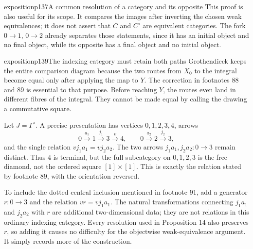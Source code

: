 \begin{dcomment}{exposition}{p137}{A common resolution of a category and its opposite}
This proof is also useful for its scope. It compares the images after inverting the chosen weak equivalences; it does not assert that $C$ and $C^\circ$ are equivalent categories. The fork $0\to1$, $0\to2$ already separates those statements, since it has an initial object and no final object, while its opposite has a final object and no initial object.
\end{dcomment}

\begin{dcomment}{exposition}{p139}{The indexing category must retain both paths}
Grothendieck keeps the entire comparison diagram because the two routes from $X_0$ to the integral become equal only after applying the map to $Y$. The correction in footnotes 88 and 89 is essential to that purpose. Before reaching $Y$, the routes even land in different fibres of the integral. They cannot be made equal by calling the drawing a commutative square.

Let $J=\Gamma^\circ$. A precise presentation has vertices $0,1,2,3,4$, arrows
\[
 0\xrightarrow{a_1}1\xrightarrow{j_1}3\xrightarrow{v}4,
 \qquad
 0\xrightarrow{a_2}2\xrightarrow{j_2}3,
\]
and the single relation $v j_1a_1=v j_2a_2$. The two arrows $j_1a_1,j_2a_2:0\to3$ remain distinct. Thus $4$ is terminal, but the full subcategory on $0,1,2,3$ is the free diamond, not the ordered square $[1]\times[1]$. This is exactly the relation stated by footnote 89, with the orientation reversed.

To include the dotted central inclusion mentioned in footnote 91, add a generator $r:0\to3$ and the relation $vr=vj_1a_1$. The natural transformations connecting $j_1a_1$ and $j_2a_2$ with $r$ are additional two-dimensional data; they are not relations in this ordinary indexing category. Every resolution used in Proposition 14 also preserves $r$, so adding it causes no difficulty for the objectwise weak-equivalence argument. It simply records more of the construction.
\end{dcomment}

